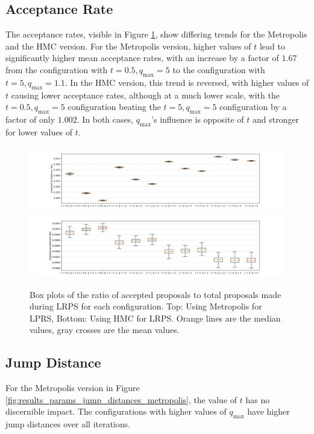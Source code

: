 \documentclass[12pt, a4paper]{report}
\begin{document}
\subsection{Acceptance Rate}
The acceptance rates, visible in Figure \ref{fig:results_params_acceptance_rates}, show differing trends for the Metropolis and the HMC version.
For the Metropolis version, higher values of $t$ lead to significantly higher mean acceptance rates, with an increase by a factor of $1.67$ from the configuration with $t=0.5, q_{\textrm{max}}=5$ to the configuration with $t=5, q_{\textrm{max}}=1.1$.
In the HMC version, this trend is reversed, with higher values of $t$ causing lower acceptance rates, although at a much lower scale, with the $t=0.5, q_{\textrm{max}}=5$ configuration beating the $t=5, q_{\textrm{max}}=5$ configuration by a factor of only $1.002$.
In both cases, $q_{\textrm{max}}$'s influence is opposite of $t$ and stronger for lower values of $t$.
\begin{figure}
    \centering
    \includegraphics[trim={3cm 0cm 3cm 0cm}, clip, width=\textwidth]{figs/results/params/acceptance_rates_metropolis.png}
    \includegraphics[trim={3cm 0cm 3cm 0cm}, clip, width=\textwidth]{figs/results/params/acceptance_rates_hmc.png}
    \caption{Box plots of the ratio of accepted proposals to total proposals made during LRPS for each configuration. Top: Using Metropolis for LPRS, Bottom: Using HMC for LRPS. Orange lines are the median values, gray crosses are the mean values.}
    \label{fig:results_params_acceptance_rates}
\end{figure}

\subsection{Jump Distance}
For the Metropolis version in Figure \ref{fig:results_params_jump_distances_metropolis}, the value of $t$ has no discernible impact.
The configurations with higher values of $q_{\textrm{max}}$ have higher jump distances over all iterations.
\end{document}
